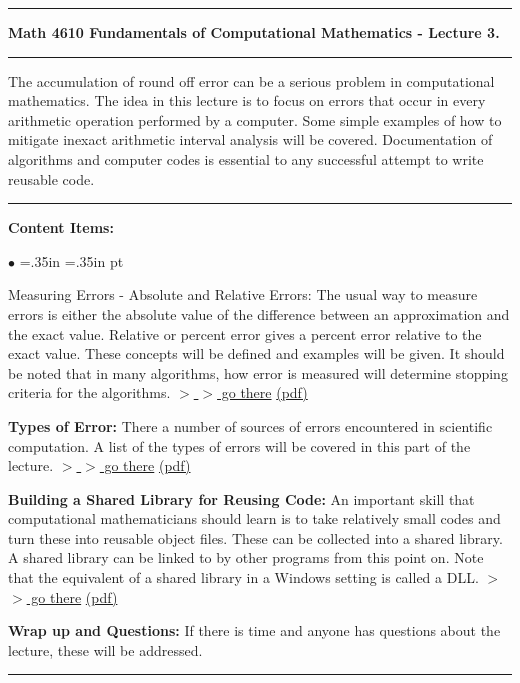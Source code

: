 \documentclass[10pt,fleqn]{article}
\begin{document}
\vskip0.1in\hrule\vskip0.1in
\noindent
{\bf Math 4610 Fundamentals of Computational Mathematics  - Lecture 3.} 
\vskip0.1in\hrule\vskip0.1in
\noindent
The accumulation of round off error can be a serious problem in computational
mathematics. The idea in this lecture is to focus on errors that occur in every
arithmetic operation performed by a computer.  Some simple examples of how to
mitigate inexact arithmetic interval analysis will be covered. Documentation of
algorithms and computer codes is essential to any successful attempt to write
reusable code. 
\vskip0.1in\hrule\vskip0.1in
\noindent
{\bf Content Items:}
\begin{list}{$\bullet$}{ \parsep=0pt \listparindent=0pt
\topsep=0pt \rightmargin=.35in \leftmargin=.35in  pt
\itemsep=2pt}
  \item {Measuring Errors - Absolute and Relative Errors:} The usual way to
     measure errors is either the absolute value of the difference between an
     approximation and the exact value. Relative or percent error gives a
     percent error relative to the exact value. These concepts will be defined
     and examples will be given. It should be noted that in many algorithms,
     how error is measured will determine stopping criteria for the algorithms.
     \href{https://jvkoebbe.github.io/math4610/lectures/lecture_03/html/absolute_relative_error.html}{$>$ $>$ go there}
     \href{https://jvkoebbe.github.io/math4610/lectures/lecture_03/pdf/absolute_relative_error.pdf}{(pdf)}
  \item {\bf Types of Error:} There a number of sources of errors encountered in
     scientific computation. A list of the types of errors will be covered in
     this part of the lecture.
     \href{https://jvkoebbe.github.io/math4610/lectures/lecture_03/html/types_of_error.html}{$>$ $>$ go there}
     \href{https://jvkoebbe.github.io/math4610/lectures/lecture_03/pdf/types_of_error.pdf}{(pdf)}
  \item{\bf Building a Shared Library for Reusing Code:} An important skill that
     computational mathematicians should learn is to take relatively small codes
     and turn these into reusable object files. These can be collected into a
     shared library. A shared library can be linked to by other programs from
     this point on. Note that the equivalent of a shared library in a Windows
     setting is called a DLL.
     \href{https://jvkoebbe.github.io/math4610/lectures/lecture_03/md/shared_library_example}{$>$ $>$ go there}
     \href{https://jvkoebbe.github.io/math4610/lectures/lecture_03/pdf/shared_library_example.pdf}{(pdf)}
  \item{\bf Wrap up and Questions:}  If there is time and anyone has questions
     about the lecture, these will be addressed.
\end{list}
\vskip0.1in\hrule\vskip0.1in
\end{document}
